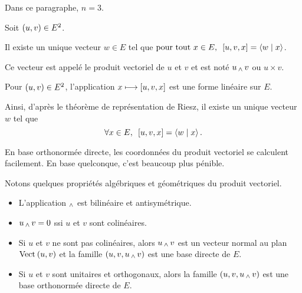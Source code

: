 Dans ce paragraphe, \(n=3\).

\begin{prop}
Soit \(\left(u,v\right)\in E^2\).

Il existe un unique vecteur \(w\in E\) tel que \(\quantifs{\tpt x\in E}\croch{u,v,x}=\ps{w}{x}\).

Ce vecteur est appelé le produit vectoriel de \(u\) et \(v\) et est noté \(u\operatorname{_\wedge} v\) ou \(u\times v\).
\end{prop}

\begin{dem}
Pour \(\left(u,v\right)\in E^2\), l'application \(x\longmapsto\left[u,v,x\right]\) est une forme linéaire sur \(E\).

Ainsi, d'après le théorème de représentation de Riesz, il existe un unique vecteur \(w\) tel que \[\quantifs{\forall x\in E}\croch{u,v,x}=\ps{w}{x}.\]
\end{dem}

En base orthonormée directe, les coordonnées du produit vectoriel se calculent facilement. En base quelconque, c'est beaucoup plus pénible.

Notons quelques propriétés algébriques et géométriques du produit vectoriel.

\begin{prop}
\begin{itemize}
    \item L'application \(\operatorname{_\wedge}\) est bilinéaire et antisymétrique. \\
    \item \(u\operatorname{_\wedge} v=0\) ssi \(u\) et \(v\) sont colinéaires. \\
    \item Si \(u\) et \(v\) ne sont pas colinéaires, alors \(u\operatorname{_\wedge} v\) est un vecteur normal au plan \(\Vect{u,v}\) et la famille \(\left(u,v,u\operatorname{_\wedge} v\right)\) est une base directe de \(E\). \\
    \item Si \(u\) et \(v\) sont unitaires et orthogonaux, alors la famille \(\left(u,v,u\operatorname{_\wedge} v\right)\) est une base orthonormée directe de \(E\).
\end{itemize}
\end{prop}


